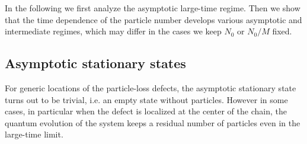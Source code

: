   In the following we first analyze the asymptotic large-time regime.
  Then we show that the time dependence of the particle number develops
  various asymptotic and intermediate regimes, which may differ in the
  cases we keep $N_0$ or $N_0/M$ fixed.
  
  
  \subsection{Asymptotic stationary states}
  \label{asysta}
  
  For generic locations of the particle-loss defects, the asymptotic
  stationary state turns out to be trivial, i.e. an empty state without
  particles. However in some cases, in particular when the defect is
  localized at the center of the chain, the quantum evolution of the
  system keeps a residual number of particles even in the large-time
  limit.
  
